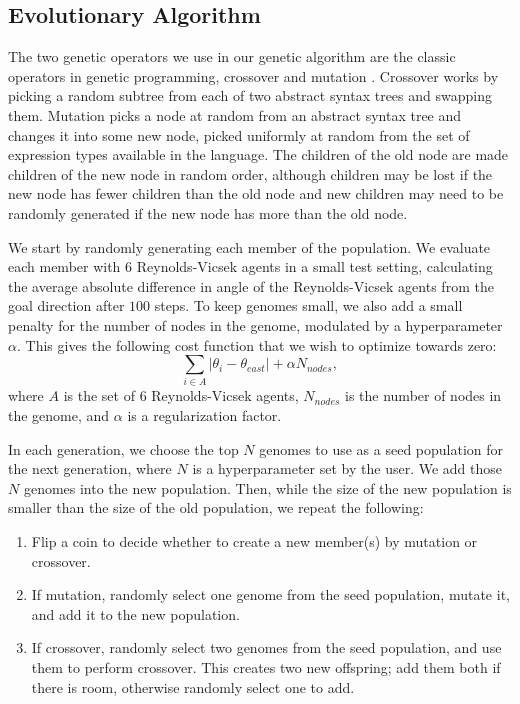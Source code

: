 \subsection{Evolutionary Algorithm}
\label{sec:evolutionaryalg}
The two genetic operators we use in our genetic algorithm are the classic
operators in genetic programming, crossover and mutation \cite{deCastro2007}.
Crossover works by picking a random subtree from each of two abstract syntax
trees and swapping them.
Mutation picks a node at random from an abstract syntax tree and changes it
into some new node, picked uniformly at random from the set of expression types
available in the language.
The children of the old node are made children of the new node in random order,
although children may be lost if the new node has fewer children than the old
node and new children may need to be randomly generated if the new node has
more than the old node.

We start by randomly generating each member of the population.
We evaluate each member with $6$ Reynolds-Vicsek agents in a small test setting,
calculating the average absolute difference in angle of the Reynolds-Vicsek
agents from the goal direction after $100$ steps.
To keep genomes small, we also add a small penalty for the number of nodes in
the genome, modulated by a hyperparameter $\alpha$.
This gives the following cost function that we wish to optimize towards zero:
\[ \sum_{i\in A} |\theta_i - \theta_{east}| + \alpha N_{nodes}, \]
where $A$ is the set of $6$ Reynolds-Vicsek agents, $N_{nodes}$ is the number
of nodes in the genome, and $\alpha$ is a regularization factor.

In each generation, we choose the top $N$ genomes to use as a seed population
for the next generation, where $N$ is a hyperparameter set by the user.
We add those $N$ genomes into the new population.
Then, while the size of the new population is smaller than the size of the
old population, we repeat the following:
\begin{enumerate}
    \item Flip a coin to decide whether to create a new member(s) by mutation
    or crossover.
    \item If mutation, randomly select one genome from the seed population,
    mutate it, and add it to the new population.
    \item If crossover, randomly select two genomes from the seed population,
    and use them to perform crossover.
    This creates two new offspring; add them both if there is room, otherwise
    randomly select one to add.
\end{enumerate}

